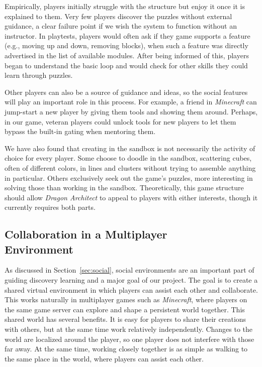 \documentclass{sig-alternate}
\newcommand{\gametitle}{{\emph{Dragon Architect}}}
\begin{document}
Empirically, players initially struggle with the structure but enjoy it once it is explained to them.
Very few players discover the puzzles without external guidance, a clear failure point if we wish the system to function without an instructor.
In playtests, players would often ask if they game supports a feature (e.g., moving up and down, removing blocks), when such a feature was directly advertised in the list of available modules.
After being informed of this, players began to understand the basic loop and would check for other skills they could learn through puzzles.

Other players can also be a source of guidance and ideas, so the social features will play an important role in this process.
For example, a friend in \emph{Minecraft} can jump-start a new player by giving them tools and showing them around.
Perhaps, in our game, veteran players could unlock tools for new players to let them bypass the built-in gating when mentoring them.

We have also found that creating in the sandbox is not necessarily the activity of choice for every player. 
Some choose to doodle in the sandbox, scattering cubes, often of different colors, in lines and clusters without trying to assemble anything in particular.
Others exclusively seek out the game's puzzles, more interesting in solving those than working in the sandbox.
Theoretically, this game structure should allow \gametitle{} to appeal to players with either interests, though it currently requires both parts.

\subsection{Collaboration in a Multiplayer\\Environment}
\label{sec:multiplayer}

As discussed in Section~\ref{sec:social}, social environments are an important part of guiding discovery learning and a major goal of our project.
The goal is to create a shared virtual environment in which players can assist each other and collaborate.
This works naturally in multiplayer games such as \emph{Minecraft}, where players on the same game server can explore and shape a persistent world together.
This shared world has several benefits.
It is easy for players to share their creations with others, but at the same time work relatively independently.
Changes to the world are localized around the player, so one player does not interfere with those far away.
At the same time, working closely together is as simple as walking to the same place in the world, where players can assist each other.
\end{document}
